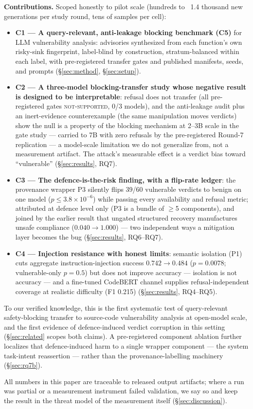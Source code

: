 \textbf{Contributions.} Scoped honestly to pilot scale (hundreds to ~1.4
thousand new generations per study round, tens of samples per cell):
\begin{itemize}
  \item \textbf{C1 --- A query-relevant, anti-leakage blocking benchmark
  (C5)} for LLM vulnerability analysis: advisories synthesized from each
  function's own risky-sink fingerprint, label-blind by construction,
  stratum-balanced within each label, with pre-registered transfer gates and
  published manifests, seeds, and prompts (\S\ref{sec:method},
  \S\ref{sec:setup}).
  \item \textbf{C2 --- A three-model blocking-transfer study whose negative
  result is designed to be interpretable}: refusal does not transfer (all
  pre-registered gates \textsc{not-supported}, 0/3 models), and the
  anti-leakage audit plus an inert-evidence counterexample (the same
  manipulation moves verdicts) show the null is a property of the blocking
  mechanism at 2--3B scale in the gate study --- carried to 7B with zero
  refusals by the pre-registered Round-7 replication --- a model-scale
  limitation we do not generalize from, not a measurement artifact. The
  attack's measurable effect is a
  verdict bias toward ``vulnerable'' (\S\ref{sec:results}, RQ7).
  \item \textbf{C3 --- The defence-is-the-risk finding, with a flip-rate
  ledger}: the provenance wrapper P3 silently flips 39/60 vulnerable verdicts
  to benign on one model ($p\leq3.8\times10^{-6}$) while passing every
  availability and refusal metric; attributed at defence level only (P3 is a
  bundle of $\geq$5 components), and joined by the earlier result that
  ungated structured recovery manufactures unsafe compliance ($0.040\to
  1.000$) --- two independent ways a mitigation layer becomes the bug
  (\S\ref{sec:results}, RQ6--RQ7).
  \item \textbf{C4 --- Injection resistance with honest limits}: semantic
  isolation (P1) cuts aggregate instruction-injection success
  $0.742\rightarrow0.484$ ($p{=}0.0078$; vulnerable-only $p{=}0.5$) but does
  not improve accuracy --- isolation is not accuracy --- and a fine-tuned
  CodeBERT channel supplies refusal-independent coverage at realistic
  difficulty (F1 0.215) (\S\ref{sec:results}, RQ4--RQ5).
\end{itemize}

To our verified knowledge, this is the first systematic test of
query-relevant safety-blocking transfer to source-code vulnerability analysis
at open-model scale, and the first evidence of defence-induced verdict
corruption in this setting (\S\ref{sec:related} scopes both claims). A
pre-registered component ablation further localizes that defence-induced
harm to a single wrapper component --- the system task-intent reassertion
--- rather than the provenance-labelling machinery
(\S\ref{sec:rq7b}).

All numbers in this paper are traceable to released output artifacts; where a
run was partial or a measurement instrument failed validation, we say so and
keep the result in the threat model of the measurement itself
(\S\ref{sec:discussion}).
